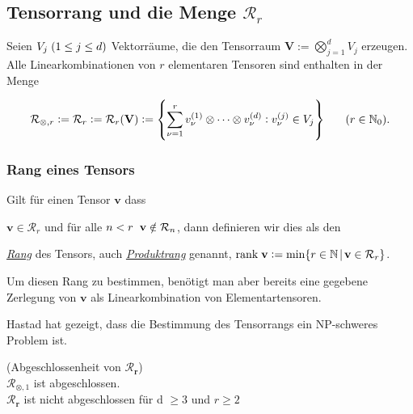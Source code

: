 \documentclass[11pt]{article} %
\begin{document}
\subsection{Tensorrang und die Menge $\mathcal{R}_{r}$}
\begin{changemargin}{0pt}{0pt}

Seien $V_{j} \hspace{1mm} (1\leq j \leq d)$ Vektorräume, die den Tensorraum $\mathbf{V} := \bigotimes^{d}_{j=1} V_{j}$ erzeugen. Alle Linearkombinationen
von $r$ elementaren Tensoren sind enthalten in der Menge

\[\mathcal{R}_{\otimes,r} := \mathcal{R}_{r} := \mathcal{R}_{r}(\mathbf{V}) := \left\{ \sum^{r}_{\nu=1} v^{(1)}_{\nu} \otimes \dots \otimes v^{(d)}_{\nu} : v^{(j)}_{\nu} \in V_{j} \right\} \hspace{6mm} (r \in \mathbb{N}_{0}).\]

\subsubsection{Rang eines Tensors}

Gilt für einen Tensor $\mathbf{v}$ dass

$ \mathbf{v} \in \mathcal{R}_{r}$ und für alle $n<r \hspace{2mm} \mathbf{v} \notin \mathcal{R}_{n}$, dann definieren wir dies als den

\textit{\underline{Rang}} des Tensors, auch \textit{\underline{Produktrang}} genannt,
 $\text{rank} \hspace{1mm} \mathbf{v} := \min\{ r \in \mathbb{N} \hspace{0.5mm} | \hspace{0.5mm} \mathbf{v} \in \mathcal{R}_{r} \}$.

Um diesen Rang zu bestimmen, benötigt man aber bereits eine gegebene Zerlegung von $\mathbf{v}$ als Linearkombination von Elementartensoren.

Hastad \cite{hastad} hat gezeigt, dass die Bestimmung des Tensorrangs ein NP-schweres Problem ist.

\begin{rmk} (Abgeschlossenheit von $\mathcal{R}_{\mathbf{r}}$)
\\$\mathcal{R}_{\otimes,1}$ ist abgeschlossen.
\\$\mathcal{R}_{\mathbf{r}}$ ist nicht abgeschlossen für d $\geq 3$ und $r \geq 2$
\end{rmk}


\end{changemargin}
\end{document}
